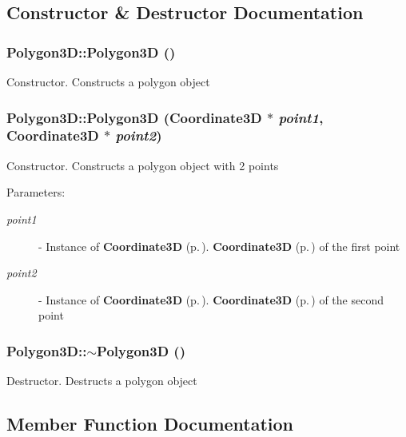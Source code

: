 \subsection{Constructor \& Destructor Documentation}
\subsubsection{\setlength{\rightskip}{0pt plus 5cm}Polygon3D::Polygon3D ()}\label{classPolygon3D_a0}


Constructor. Constructs a polygon object 
\subsubsection{\setlength{\rightskip}{0pt plus 5cm}Polygon3D::Polygon3D ({\bf Coordinate3D} $\ast$ {\em point1}, {\bf Coordinate3D} $\ast$ {\em point2})}\label{classPolygon3D_a1}


Constructor. Constructs a polygon object with 2 points \begin{Desc}
\item[Parameters: ]\par
\begin{description}
\item[{\em 
point1}]- Instance of {\bf Coordinate3D} {\rm (p.\,\pageref{classCoordinate3D})}. {\bf Coordinate3D} {\rm (p.\,\pageref{classCoordinate3D})} of the first point \item[{\em 
point2}]- Instance of {\bf Coordinate3D} {\rm (p.\,\pageref{classCoordinate3D})}. {\bf Coordinate3D} {\rm (p.\,\pageref{classCoordinate3D})} of the second point \end{description}
\end{Desc}
\subsubsection{\setlength{\rightskip}{0pt plus 5cm}Polygon3D::$\sim$Polygon3D ()}\label{classPolygon3D_a2}


Destructor. Destructs a polygon object 

\subsection{Member Function Documentation}
